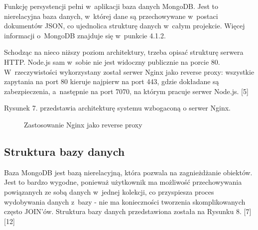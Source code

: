 \documentclass[12pt,a4paper,notitlepage]{article}
\begin{document}
\par Funkcję persystencji pełni w~aplikacji baza danych MongoDB. Jest to nierelacyjna baza danych, w~której dane są przechowywane w~postaci dokumentów JSON, co ujednolica strukturę danych w~całym projekcie. Więcej informacji o~MongoDB znajduje się w~punkcie 4.1.2.

\par Schodząc na nieco niższy poziom architektury, trzeba opisać strukturę serwera HTTP. Node.js sam w~sobie nie jest widoczny publicznie na porcie 80. W~rzeczywistości wykorzystany został serwer Nginx jako reverse proxy: wszystkie zapytania na port 80 kieruje najpierw na port 443, gdzie dokładane są zabezpieczenia, a~następnie na port 7070, na którym pracuje serwer Node.js. [5]
\par Rysunek 7. przedstawia architekturę systemu wzbogaconą o serwer Nginx.

\begin{figure}[H]
\begin{center}
\caption{Zastosowanie Nginx jako reverse proxy}
\end{center}
\end{figure}

\subsection{Struktura bazy danych}
Baza MongoDB jest bazą nierelacyjną, która pozwala na zagnieżdżanie obiektów. Jest to bardzo wygodne, ponieważ użytkownik ma możliwość przechowywania powiązanych ze sobą danych w~jednej kolekcji, co przyspiesza proces wydobywania danych z~bazy - nie ma konieczności tworzenia skomplikowanych często JOIN'ów. Struktura bazy danych przedstawiona została na Rysunku 8. [7] [12]
\end{document}
